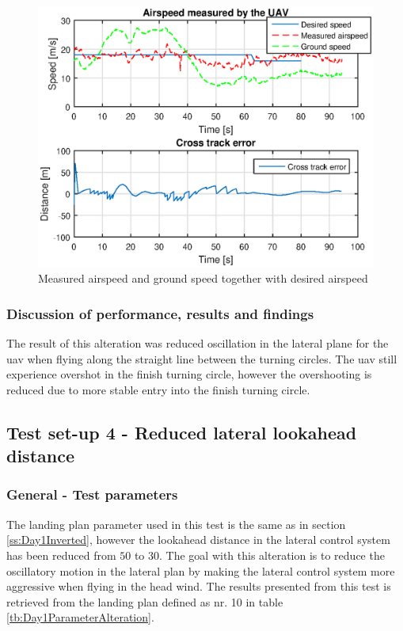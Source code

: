 \begin{figure}[H]
\centering
\includegraphics[scale=0.9]{figs/Experiment/airspeed31mai125420.eps}
\caption{Measured airspeed and ground speed together with desired airspeed}
\label{Fig:Airspeed31mai125420}
\end{figure}
\subsubsection{Discussion of performance, results and findings}
The result of this alteration was reduced oscillation in the lateral plane for the \gls{uav} when flying along the straight line between the turning circles. The \gls{uav} still experience overshot in the finish turning circle, however the overshooting is reduced due to more stable entry into the finish turning circle.
\subsection{Test set-up 4 - Reduced lateral lookahead distance}\label{ss:Day1:ReducedLookahead}
\subsubsection{General - Test parameters}
The landing plan parameter used in this test is the same as in section \ref{ss:Day1Inverted}, however the lookahead distance in the lateral control system has been reduced from $50$ to $30$. The goal with this alteration is to reduce the oscillatory motion in the lateral plan by making the lateral control system more aggressive when flying in the head wind. The results presented from this test is retrieved from the landing plan defined as nr. 10 in table \ref{tb:Day1ParameterAlteration}.

